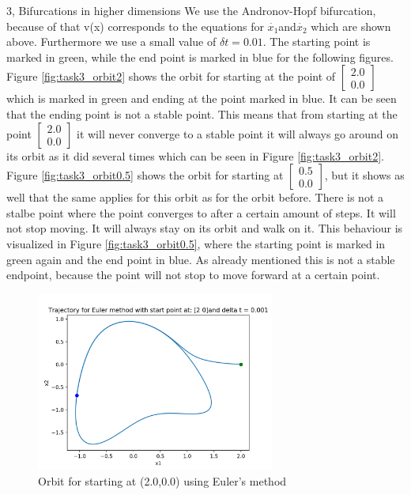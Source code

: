 \documentclass[10pt,a4paper]{article}
\begin{document}
\begin{task}{3, Bifurcations in higher dimensions}
We use the Andronov-Hopf bifurcation, because of that v(x) corresponds to the equations for $\dot{x_1} $and$\dot{x_2}$ which are shown above. Furthermore we use a small value of $\delta t = 0.01$. The starting point is marked in green, while the end point is marked in blue for the following figures. Figure \ref{fig:task3_orbit2} shows the orbit for starting at the point of $\begin{bmatrix} 2.0\\0.0\end{bmatrix}$ which is marked in green and ending at the point marked in blue. It can be seen that the ending point is not a stable point. This means that from starting at the point $\begin{bmatrix} 2.0\\0.0\end{bmatrix}$ it will never converge to a stable point it will always go around on its orbit as it did several times which can be seen in Figure \ref{fig:task3_orbit2}. Figure \ref{fig:task3_orbit0.5} shows the orbit for starting at $\begin{bmatrix} 0.5\\0.0\end{bmatrix}$, but it shows as well that the same applies for this orbit as for the orbit before. There is not a stalbe point where the point converges to after a certain amount of steps. It will not stop moving. It will always stay on its orbit and walk on it. This behaviour is visualized in Figure \ref{fig:task3_orbit0.5}, where the starting point is marked in green again and the end point in blue. As already mentioned this is not a stable endpoint, because the point will not stop to move forward at a certain point.
\begin{figure}[H]
    \centering
    \includegraphics[width=0.7\textwidth]{../plots/Figure_3.png}
    \caption{Orbit for starting at (2.0,0.0) using Euler's method}

\end{figure}
\end{task}
\end{document}
